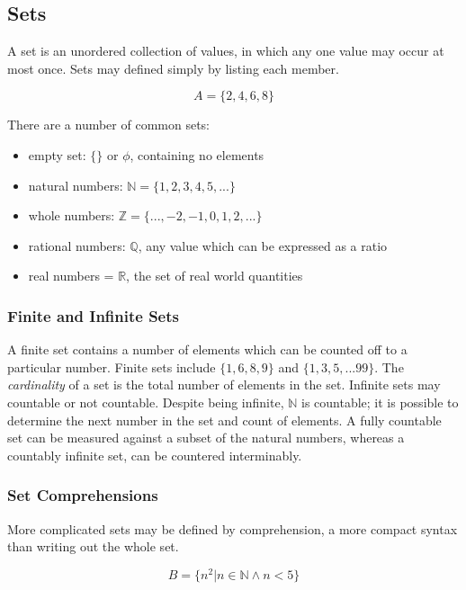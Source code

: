 \documentclass[11pt]{article}
\begin{document}
\subsection{Sets}
\label{sec:org011ea4f}

A set is an unordered collection of values, in which any one value may occur at most once. Sets may defined simply by listing each member.

\[A = \{2,4,6,8\}\]

There are a number of common sets:

\begin{itemize}
\item empty set: \(\{\}\) or \(\phi\), containing no elements
\item natural numbers: \(\mathbb{N} = \{1,2,3,4,5,...\}\)
\item whole numbers: \(\mathbb{Z} = \{...,-2,-1,0,1,2,...\}\)
\item rational numbers: \(\mathbb{Q}\), any value which can be expressed as a ratio
\item real numbers = \(\mathbb{R}\), the set of real world quantities
\end{itemize}

\subsubsection{Finite and Infinite Sets}
\label{sec:org8e7fdc9}

A finite set contains a number of elements which can be counted off to a particular number. Finite sets include \(\{1,6,8,9\}\) and \(\{1,3,5,...99\}\). The \emph{cardinality} of a set is the total number of elements in the set. Infinite sets may countable or not countable. Despite being infinite, \(\mathbb{N}\) is countable; it is possible to determine the next number in the set and count of elements. A fully countable set can be measured against a subset of the natural numbers, whereas a countably infinite set, can be countered interminably.

\subsubsection{Set Comprehensions}
\label{sec:orge571297}

More complicated sets may be defined by comprehension, a more compact syntax than writing out the whole set.

\[B = \{n^2 | n \in \mathbb{N} \wedge n < 5\}\]
\end{document}

